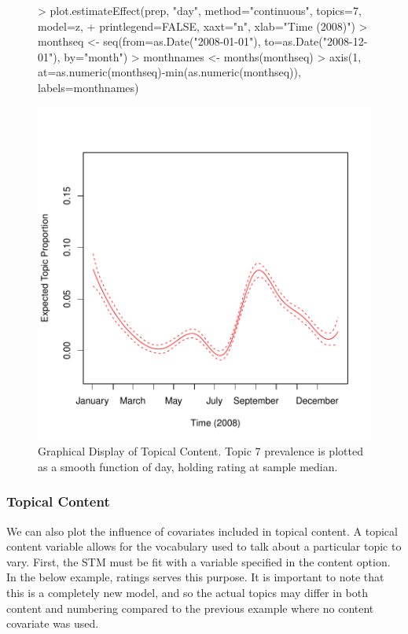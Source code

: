 \documentclass[nojss]{jss}
\begin{document}
\begin{figure}[t!]
\begin{center}
\begin{Schunk}
\begin{Sinput}
> plot.estimateEffect(prep, "day", method="continuous", topics=7, model=z,
+ printlegend=FALSE, xaxt="n", xlab="Time (2008)")
> monthseq <- seq(from=as.Date("2008-01-01"), to=as.Date("2008-12-01"), by="month")
> monthnames <- months(monthseq)
> axis(1, at=as.numeric(monthseq)-min(as.numeric(monthseq)), labels=monthnames)
\end{Sinput}
\end{Schunk}
\includegraphics{stmVignette-015}
\caption{Graphical Display of Topical Content. Topic 7 prevalence is plotted as a smooth function of day, holding rating at sample median.}
\label{fig:spline}
\end{center}
\end{figure}


\subsubsection{Topical Content}
We can also plot the influence of covariates included in topical content. A topical content variable allows for the vocabulary used to talk about a particular topic to vary. First, the STM must be fit with a variable specified in the content option. In the below example, ratings serves this purpose. It is important to note that this is a completely new model, and so the actual topics may differ in both content and numbering compared to the previous example where no content covariate was used.
\end{document}
